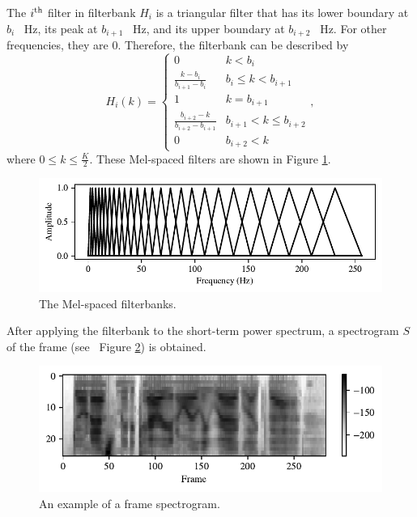 			The $i\textsuperscript{th}$ filter in filterbank $H_i$ is a triangular filter that has its lower boundary at $b_{i}$ \SI{}{\Hz}, its peak at $b_{i+1}$ \SI{}{\Hz}, and its upper boundary at $b_{i+2}$ \SI{}{\Hz}.
			For other frequencies, they are 0.
			Therefore, the filterbank can be described by
			\begin{equation}
				H_i(k) = \begin{cases}
					0 & k<b_i\\
					\frac{k-b_i}{b_{i+1}-b_i} & b_i\leq k < b_{i+1} \\
					1 & k = b_{i+1} \\
					\frac{b_{i+2} - k}{b_{i+2}-b_{i+1}} & b_{i+1} < k \leq b_{i+2}\\
					0 & b_{i+2} < k
				\end{cases},
			\end{equation}
			where $0 \leq k \leq \frac{K}{2}$.
			These Mel-spaced filters are shown in Figure \ref{fig:filterbank}.
			\begin{figure}[ht]
				\centering
			    \includegraphics[width=\linewidth]{gfx/fbanks}
			    \caption{The Mel-spaced filterbanks.}
			    \label{fig:filterbank}
			\end{figure}

			After applying the filterbank to the short-term power spectrum, a spectrogram $S$ of the frame (see \eg~Figure \ref{fig:spectrogram}) is obtained.

			\begin{figure}[ht]
				\centering
			    \includegraphics[width=\linewidth]{gfx/spectrogram}
			    \caption{An example of a frame spectrogram.}
			    \label{fig:spectrogram}
			\end{figure}

